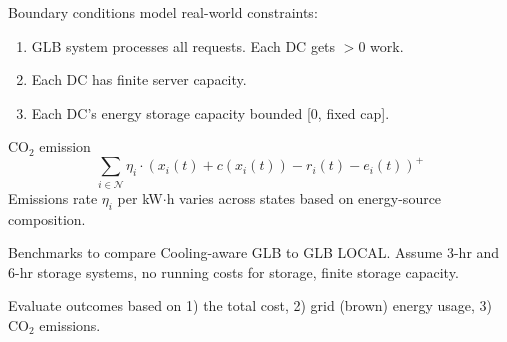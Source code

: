 \documentclass[xcolor=dvipsnames]{beamer}
\newcommand{\carbondioxide}{\ensuremath{\mathrm{CO}_2}}
\begin{document}
\begin{frame}{}

	\begin{block}{Boundary conditions model real-world constraints:}
	\begin{enumerate}
	\item
	GLB system processes all requests. Each DC gets $>0$ work.
	\item
	Each DC has finite server capacity. %
	\item
	Each DC's energy storage capacity bounded [$0$, fixed cap].
	\end{enumerate}
	\end{block}
\vspace{-3mm}
\begin{block}{\carbondioxide{} emission}
\vspace{-3mm}
$$\sum_{i \in \mathcal{N}} \eta_i \cdot (x_i(t) + c(x_i(t)) - r_i(t) - e_i(t))^+$$
Emissions rate $\eta_i$ per kW$\cdot{}$h varies across states based on energy-source composition.  %
\end{block}



\begin{block}{Benchmarks to compare Cooling-aware GLB to GLB LOCAL.}
Assume 3-hr and 6-hr storage systems, no running costs for storage, finite storage capacity. 
\end{block}
\begin{block}{Evaluate outcomes based on 1) the total cost, 2) grid (brown) energy usage, 3) \carbondioxide{} emissions.}
\end{block}
\end{frame}

\end{document}
